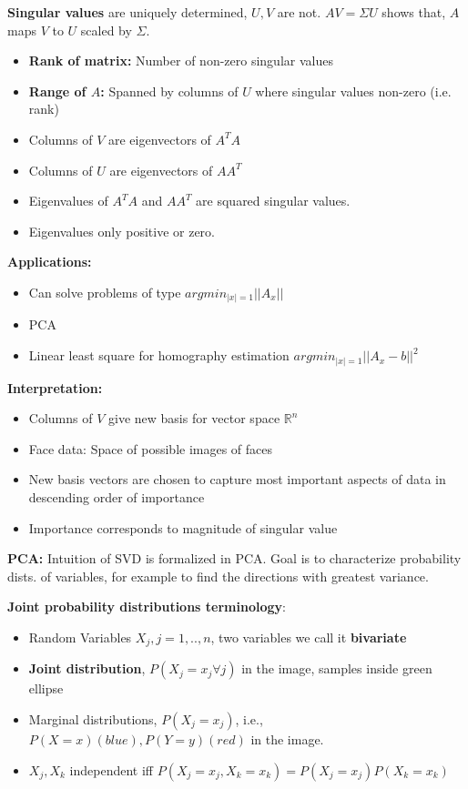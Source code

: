 \textbf{Singular values} are uniquely determined, $U,V$ are not. $AV = \Sigma U$ shows that, $A$ maps $V$ to $U$ scaled by $\Sigma$.
\begin{itemize}
\item \textbf{Rank of matrix:} Number of non-zero singular values
\item \textbf{Range of $A$:} Spanned by columns of $U$ where singular values non-zero (i.e. rank)
\item Columns of $V$ are eigenvectors of $A^T A$
\item Columns of $U$ are eigenvectors of $AA^T$
\item Eigenvalues of $A^T A$ and $AA^T$ are squared singular values.
\item Eigenvalues only positive or zero.
\end{itemize}

\textbf{Applications:}

\begin{itemize}
    \item Can solve problems of type $argmin_{|x| = 1} ||A_x||$
    \item PCA
    \item Linear least square for homography estimation  $argmin_{|x| = 1} ||A_x - b||^2$
\end{itemize}

\textbf{Interpretation:}

\begin{itemize}
    \item Columns of $V$ give new basis for vector space $\mathbb{R}^n$
    \item Face data: Space of possible images of faces
    \item New basis vectors are chosen to capture most important aspects of data in descending order of importance
    \item Importance corresponds to magnitude of singular value
\end{itemize}

\textbf{PCA:} Intuition of SVD is formalized in PCA. Goal is to characterize probability dists. of variables, for example to find the directions with greatest variance.

\textbf{Joint probability distributions terminology}:

\begin{itemize}
    \item Random Variables $X_j, j=1,..,n$, two variables we call it \textbf{bivariate}
    \item \textbf{Joint distribution}, $P(X_j=x_j \forall j)$ in the image, samples inside green ellipse
    \item Marginal distributions, $P(X_j = x_j)$, i.e., $P(X=x)(blue), P(Y=y)(red)$ in the image.
    \item $X_j, X_k$ independent iff  $P(X_j=x_j, X_k=x_k) = P(X_j = x_j)P(X_k=x_k)$
\end{itemize}

